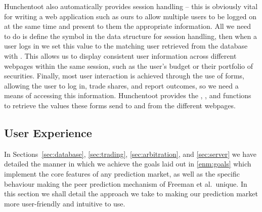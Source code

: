 Hunchentoot also automatically provides session handling -- this is obviously
vital for writing a web application such as ours to allow multiple users to be
logged on at the same time and present to them the appropriate information.
All we need to do is define the symbol  in the data
structure for session handling, then when a user logs in we set this value to
the matching user retrieved from the database with . This allows us to display consistent user information across
different webpages within the same session, such as the user's budget or their
portfolio of securities. Finally, most user interaction is achieved through the
use of forms, allowing the user to log in, trade shares, and report outcomes,
so we need a means of accessing this information. Hunchentoot provides the
, , and  functions to
retrieve the values these forms send to and from the different webpages.


\subsection{User Experience}

\label{sec:user-experience}

In Sections~\ref{sec:database}, \ref{sec:trading}, \ref{sec:arbitration}, and
\ref{sec:server} we have detailed the manner in which we achieve the goals laid
out in \ref{enm:goals} which implement the core features of any prediction
market, as well as the specific behaviour making the peer prediction mechanism
of Freeman et al.\ unique. In this section we shall detail the approach we take
to making our prediction market more user-friendly and intuitive to use.


